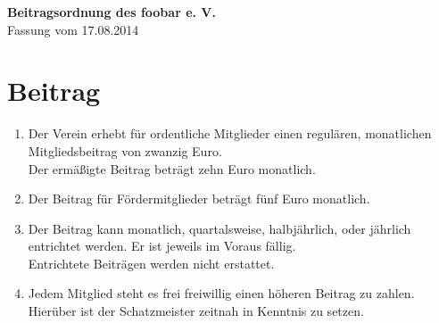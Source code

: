 \documentclass[10pt,a4paper]{scrartcl}
\begin{document}
\noindent
{\huge\bfseries Beitragsordnung des foobar e. V.}\\[0.5cm]
Fassung vom 17.08.2014


\section{Beitrag}

\begin{enumerate}[label=\bfseries (\arabic*)] 
\item
  Der Verein erhebt für ordentliche Mitglieder einen regulären, monatlichen
  Mitgliedsbeitrag von zwanzig Euro.\\
  Der ermäßigte Beitrag beträgt zehn Euro monatlich.
\item
  Der Beitrag für Fördermitglieder beträgt fünf Euro monatlich.
\item
  Der Beitrag kann monatlich, quartalsweise, halbjährlich, oder jährlich entrichtet werden.
  Er ist jeweils im Voraus fällig.\\
  Entrichtete Beiträgen werden nicht erstattet.
\item
  Jedem Mitglied steht es frei freiwillig einen höheren Beitrag zu zahlen.\\
  Hierüber ist der Schatzmeister zeitnah in Kenntnis zu setzen.
\end{enumerate}
\end{document}
